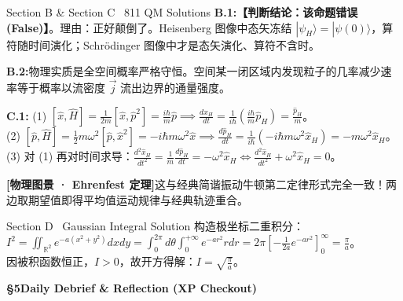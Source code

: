 \documentclass[a4paper,11pt]{article}
\newcommand{\alerttag}[1]{\textcolor{wine}{\sffamily\bfseries [#1]}}
\begin{document}
\begin{solution}{Section B \& Section C \textperiodcentered\ 811 QM Solutions}
\textbf{B.1:}\enspace \textbf{【判断结论：该命题错误 (False)】}。理由：正好颠倒了。Heisenberg 图像中态矢冻结 $|\psi_H\rangle = |\psi(0)\rangle$，算符随时间演化；Schrödinger 图像中才是态矢演化、算符不含时。

\vspace{1mm}
\textbf{B.2:}\enspace 物理实质是全空间概率严格守恒。空间某一闭区域内发现粒子的几率减少速率等于概率以流密度 $\vec{j}$ 流出边界的通量强度。

\vspace{1mm}
\textbf{C.1:}\enspace
(1) $[\hat{x}, \hat{H}] = \frac{1}{2m}[\hat{x}, \hat{p}^2] = \frac{i\hbar}{m}\hat{p} \implies \frac{d\hat{x}_H}{dt} = \frac{1}{i\hbar}\left(\frac{i\hbar}{m}\hat{p}_H\right) = \frac{\hat{p}_H}{m}$。\\
(2) $[\hat{p}, \hat{H}] = \frac{1}{2}m\omega^2 [\hat{p}, \hat{x}^2] = -i\hbar m\omega^2 \hat{x} \implies \frac{d\hat{p}_H}{dt} = \frac{1}{i\hbar}(-i\hbar m\omega^2 \hat{x}_H) = -m\omega^2 \hat{x}_H$。\\
(3) 对 (1) 再对时间求导：$\frac{d^2\hat{x}_H}{dt^2} = \frac{1}{m}\frac{d\hat{p}_H}{dt} = -\omega^2 \hat{x}_H \iff \frac{d^2\hat{x}_H}{dt^2} + \omega^2 \hat{x}_H = 0$。
\begin{notebox}
\alerttag{物理图景 · Ehrenfest 定理}\enspace 这与经典简谐振动牛顿第二定律形式完全一致！两边取期望值即得平均值运动规律与经典轨迹重合。
\end{notebox}
\end{solution}

\vspace{3pt}

\begin{solution}{Section D \textperiodcentered\ Gaussian Integral Solution}
构造极坐标二重积分：$I^2 = \iint_{\mathbb{R}^2} e^{-a(x^2+y^2)}dxdy = \int_0^{2\pi}d\theta \int_0^{+\infty} e^{-ar^2}rdr = 2\pi \left[-\frac{1}{2a}e^{-ar^2}\right]_0^\infty = \frac{\pi}{a}$。\\
因被积函数恒正，$I > 0$，故开方得解：$I = \sqrt{\frac{\pi}{a}}$。
\end{solution}

\clearpage

{\Large\sffamily\bfseries\color{navy} \S 5\quad Daily Debrief \& Reflection (XP Checkout)}
\end{document}
